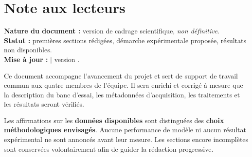 \documentclass[11pt,a4paper,oneside]{report}
\begin{document}


\chapter*{Note aux lecteurs}
\begin{encadreinfo}
\textbf{Nature du document :} version de cadrage scientifique, \emph{non définitive}.\\
\textbf{Statut :} premières sections rédigées, démarche expérimentale proposée, résultats non disponibles.\\
\textbf{Mise à jour :} \DateMiseAJour{} $\vert$ version \VersionRapport.
\end{encadreinfo}
Ce document accompagne l'avancement du projet et sert de support de travail commun aux quatre membres de l'équipe. Il sera enrichi et corrigé à mesure que la description du banc d'essai, les métadonnées d'acquisition, les traitements et les résultats seront vérifiés.

Les affirmations sur les \textbf{données disponibles} sont distinguées des \textbf{choix méthodologiques envisagés}. Aucune performance de modèle ni aucun résultat expérimental ne sont annoncés avant leur mesure. Les sections encore incomplètes sont conservées volontairement afin de guider la rédaction progressive.

\tableofcontents
\clearpage
{}









\clearpage
{}



\appendix

\end{document}
